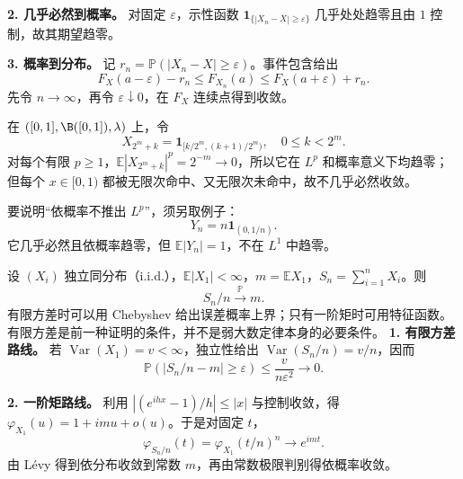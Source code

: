 \textbf{2. 几乎必然到概率。} 对固定 $\varepsilon$，示性函数 $\mathbf1_{\{|X_n-X|\ge\varepsilon\}}$ 几乎处处趋零且由 $1$ 控制，故其期望趋零。

\textbf{3. 概率到分布。} 记 $r_n=\mathbb P(|X_n-X|\ge\varepsilon)$。事件包含给出
\[
F_X(a-\varepsilon)-r_n
\le F_{X_n}(a)
\le F_X(a+\varepsilon)+r_n.
\]
先令 $n\to\infty$，再令 $\varepsilon\downarrow0$，在 $F_X$ 连续点得到收敛。

在 $([0,1],\B([0,1]),\lambda)$ 上，令
\[
X_{2^m+k}=\mathbf1_{[k/2^m,(k+1)/2^m)},
\quad 0\le k<2^m.
\]
对每个有限 $p\ge1$，$\mathbb E|X_{2^m+k}|^p=2^{-m}\to0$，所以它在 $L^p$ 和概率意义下均趋零；但每个 $x\in[0,1)$ 都被无限次命中、又无限次未命中，故不几乎必然收敛。

要说明“依概率不推出 $L^p$”，须另取例子：
\[
Y_n=n\mathbf1_{(0,1/n)}.
\]
它几乎必然且依概率趋零，但 $\mathbb E|Y_n|=1$，不在 $L^1$ 中趋零。


设 $(X_i)$ 独立同分布（i.i.d.），$\mathbb E|X_1|<\infty$，$m=\mathbb EX_1$，$S_n=\sum_{i=1}^nX_i$。则
\[
S_n/n\xrightarrow{\mathbb P}m.
\]
有限方差时可以用 Chebyshev 给出误差概率上界；只有一阶矩时可用特征函数。有限方差是前一种证明的条件，并不是弱大数定律本身的必要条件。
\textbf{1. 有限方差路线。} 若 $\operatorname{Var}(X_1)=v<\infty$，独立性给出 $\operatorname{Var}(S_n/n)=v/n$，因而
\[
\mathbb P(|S_n/n-m|\ge\varepsilon)
\le\frac{v}{n\varepsilon^2}\to0.
\]

\textbf{2. 一阶矩路线。} 利用 $|(e^{ihx}-1)/h|\le|x|$ 与控制收敛，得 $\varphi_{X_1}(u)=1+imu+o(u)$。于是对固定 $t$，
\[
\varphi_{S_n/n}(t)
=\varphi_{X_1}(t/n)^n\to e^{imt}.
\]
由 Lévy 得到依分布收敛到常数 $m$，再由常数极限判别得依概率收敛。

